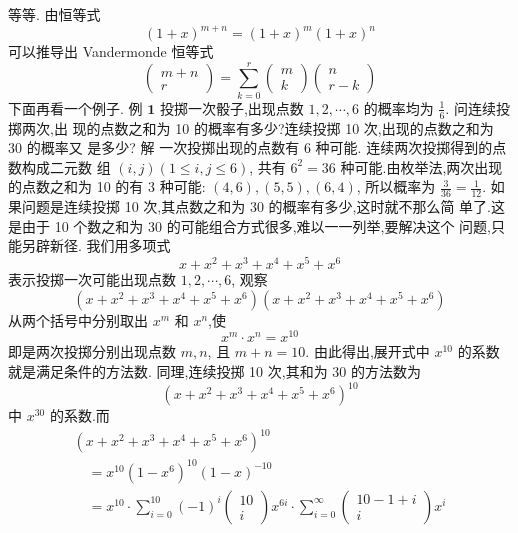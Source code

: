 \documentclass{report}
\begin{document}
等等.
由恒等式
$$
(1+x)^{m+n}=(1+x)^{m}(1+x)^{n}
$$
可以推导出 Vandermonde 恒等式
$$
\left(\begin{array}{c}
m+n \\ r
\end{array}\right)=\sum_{k=0}^{r}\left(\begin{array}{c}
m \\ k
\end{array}\right)\left(\begin{array}{c}
n \\ r-k
\end{array}\right)
$$
下面再看一个例子.
例 $\mathbf{1}$ 投掷一次骰子,出现点数 $1,2, \cdots, 6$ 的概率均为 $\frac{1}{6} .$ 问连续投掷两次,出 现的点数之和为 10 的概率有多少?连续投掷 10 次,出现的点数之和为 30 的概率又 是多少?
解 一次投掷出现的点数有 6 种可能. 连续两次投掷得到的点数构成二元数 组 $(i, j)(1 \leqslant i, j \leqslant 6)$, 共有 $6^{2}=36$ 种可能.由枚举法,两次出现的点数之和为 10 的有 3 种可能: $(4,6),(5,5),(6,4)$, 所以概率为 $\frac{3}{36}=\frac{1}{12}$.
如果问题是连续投掷 10 次,其点数之和为 30 的概率有多少,这时就不那么简 单了.这是由于 10 个数之和为 30 的可能组合方式很多,难以一一列举,要解决这个 问题,只能另辟新径.
我们用多项式
$$
x+x^{2}+x^{3}+x^{4}+x^{5}+x^{6}
$$
表示投掷一次可能出现点数 $1,2, \cdots, 6$, 观察
$$
\left(x+x^{2}+x^{3}+x^{4}+x^{5}+x^{6}\right)\left(x+x^{2}+x^{3}+x^{4}+x^{5}+x^{6}\right)
$$
从两个括号中分别取出 $x^{m}$ 和 $x^{n}$,使
$$
x^{m} \cdot x^{n}=x^{10}
$$
即是两次投掷分别出现点数 $m, n$, 且 $m+n=10 .$ 由此得出,展开式中 $x^{10}$ 的系数 就是满足条件的方法数.
同理,连续投掷 10 次,其和为 30 的方法数为
$$
\left(x+x^{2}+x^{3}+x^{4}+x^{5}+x^{6}\right)^{10}
$$
中 $x^{30}$ 的系数.而
$$
\begin{array}{l}
\left(x+x^{2}+x^{3}+x^{4}+x^{5}+x^{6}\right)^{10} \\
\quad=x^{10}\left(1-x^{6}\right)^{10}(1-x)^{-10} \\
\quad=x^{10} \cdot \sum_{i=0}^{10}(-1)^{i}\left(\begin{array}{c}
10 \\ i
\end{array}\right) x^{6 i} \cdot \sum_{i=0}^{\infty}\left(\begin{array}{c}
10-1+i \\ i
\end{array}\right) x^{i}
\end{array}
$$
\end{document}
